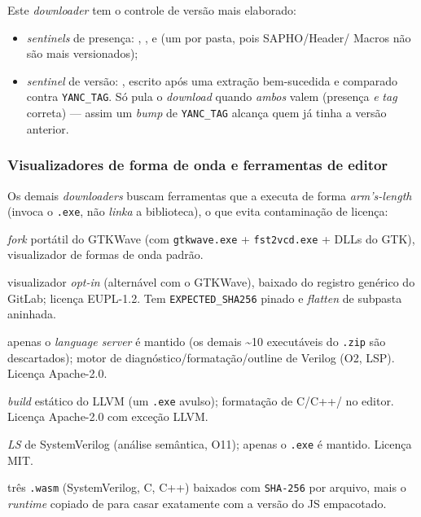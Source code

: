 Este \emph{downloader} tem o controle de versão mais elaborado:

\begin{itemize}[nosep]
  \item \emph{sentinels} de presença: ,
        ,  e
         (um por pasta, pois SAPHO/Header/
        Macros não são mais versionados);
  \item \emph{sentinel} de versão: , escrito
        após uma extração bem-sucedida e comparado contra \texttt{YANC\_TAG}.
        Só pula o \emph{download} quando \emph{ambos} valem (presença \emph{e}
        \emph{tag} correta) --- assim um \emph{bump} de \texttt{YANC\_TAG}
        alcança quem já tinha a versão anterior.
\end{itemize}

\subsubsection{Visualizadores de forma de onda e ferramentas de editor}

Os demais \emph{downloaders} buscam ferramentas que a  executa de
forma \emph{arm's-length} (invoca o \texttt{.exe}, não \emph{linka} a
biblioteca), o que evita contaminação de licença:

\begin{description}[nosep]
  \item[\tool{gtkwave-nipscern}] \emph{fork} portátil do GTKWave (com
        \texttt{gtkwave.exe} + \texttt{fst2vcd.exe} + DLLs do GTK), visualizador
        de formas de onda padrão.
  \item[\tool{Surfer}] visualizador \emph{opt-in} (alternável com o GTKWave),
        baixado do registro genérico do GitLab; licença EUPL-1.2. Tem
        \texttt{EXPECTED\_SHA256} pinado e \emph{flatten} de subpasta aninhada.
  \item[\tool{Verible}] apenas o \emph{language server}
         é mantido (os demais \textasciitilde{}10 executáveis do
        \texttt{.zip} são descartados); motor de diagnóstico/formatação/outline
        de Verilog (O2, LSP). Licença Apache-2.0.
  \item[\tool{clang-format}] \emph{build} estático do LLVM (um \texttt{.exe}
        avulso); formatação de C/C++/\cmm{} no editor. Licença Apache-2.0 com
        exceção LLVM.
  \item[\tool{slang-server}] \emph{LS} de SystemVerilog (análise semântica,
        O11); apenas o \texttt{.exe} é mantido. Licença MIT.
  \item[gramáticas \tool{tree-sitter}] três \texttt{.wasm}
        (SystemVerilog, C, C++) baixados com \texttt{SHA-256} por arquivo, mais
        o \emph{runtime}  copiado de
         para casar exatamente com a versão do JS empacotado.
\end{description}


